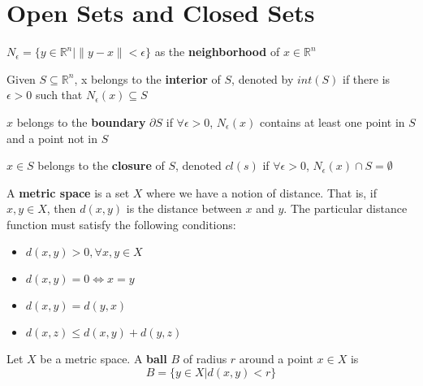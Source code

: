 			\section{Open Sets and Closed Sets}
				\begin{definition}[neighborhood]
					$N_\epsilon = \{y\in \mathbb{R}^n|\lVert y-x\rVert < \epsilon \}$ as the \textbf{neighborhood} of $x\in \mathbb{R}^n$
				\end{definition}

				\begin{definition}[interior]
					Given $S\subseteq \mathbb{R}^n$, x belongs to the \textbf{interior} of $S$, denoted by $int(S)$ if there is $\epsilon > 0$ such that $N_\epsilon(x) \subseteq S$
				\end{definition}

				\begin{definition}[boundary]
					$x$ belongs to the \textbf{boundary} $\partial S$ if $\forall \epsilon >0$, $N_\epsilon(x)$ contains at least one point in $S$ and a point not in $S$
				\end{definition}

				\begin{definition}[closure]
					$x\in S$ belongs to the \textbf{closure} of $S$, denoted $cl(s)$ if $\forall \epsilon > 0$, $N_\epsilon(x) \cap S = \emptyset$
				\end{definition}

				\begin{definition}
					A \textbf{metric space} is a set $X$ where we have a notion of distance. That is, if $x, y \in X$, then $d(x, y)$ is the distance between $x$ and $y$. The particular distance function must satisfy the following conditions:
					\begin{itemize}
						\item $d(x, y) > 0, \forall x, y \in X$
						\item $d(x, y) = 0 \iff x=y$
						\item $d(x, y) = d(y, x)$
						\item $d(x, z) \le d(x, y) + d(y, z)$
					\end{itemize}
				\end{definition}

				\begin{definition}[ball]
					Let $X$ be a metric space. A \textbf{ball} $B$ of radius $r$ around a point $x \in X$ is
					\begin{equation}
						B = \{y \in X|d(x, y) < r\}
					\end{equation}
				\end{definition}

